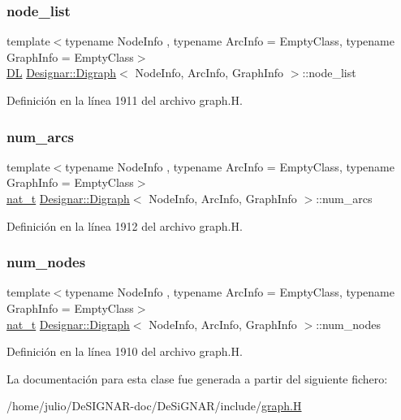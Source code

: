 \subsubsection{\texorpdfstring{node\+\_\+list}{node\_list}}
{\footnotesize\ttfamily template$<$typename Node\+Info , typename Arc\+Info  = Empty\+Class, typename Graph\+Info  = Empty\+Class$>$ \\
\hyperlink{class_designar_1_1_d_l}{DL} \hyperlink{class_designar_1_1_digraph}{Designar\+::\+Digraph}$<$ Node\+Info, Arc\+Info, Graph\+Info $>$\+::node\+\_\+list\hspace{0.3cm}{\ttfamily [protected]}}



Definición en la línea 1911 del archivo graph.\+H.

\mbox{\label{class_designar_1_1_digraph_accd2da6bdb5bc0624e7f79c904c89328}} 
\subsubsection{\texorpdfstring{num\+\_\+arcs}{num\_arcs}}
{\footnotesize\ttfamily template$<$typename Node\+Info , typename Arc\+Info  = Empty\+Class, typename Graph\+Info  = Empty\+Class$>$ \\
\hyperlink{namespace_designar_aa72662848b9f4815e7bf31a7cf3e33d1}{nat\+\_\+t} \hyperlink{class_designar_1_1_digraph}{Designar\+::\+Digraph}$<$ Node\+Info, Arc\+Info, Graph\+Info $>$\+::num\+\_\+arcs\hspace{0.3cm}{\ttfamily [protected]}}



Definición en la línea 1912 del archivo graph.\+H.

\mbox{\label{class_designar_1_1_digraph_a468cec4048ff9042a288dca47ad856aa}} 
\subsubsection{\texorpdfstring{num\+\_\+nodes}{num\_nodes}}
{\footnotesize\ttfamily template$<$typename Node\+Info , typename Arc\+Info  = Empty\+Class, typename Graph\+Info  = Empty\+Class$>$ \\
\hyperlink{namespace_designar_aa72662848b9f4815e7bf31a7cf3e33d1}{nat\+\_\+t} \hyperlink{class_designar_1_1_digraph}{Designar\+::\+Digraph}$<$ Node\+Info, Arc\+Info, Graph\+Info $>$\+::num\+\_\+nodes\hspace{0.3cm}{\ttfamily [protected]}}



Definición en la línea 1910 del archivo graph.\+H.



La documentación para esta clase fue generada a partir del siguiente fichero\+:\begin{DoxyCompactItemize}
\item 
/home/julio/\+De\+S\+I\+G\+N\+A\+R-\/doc/\+De\+Si\+G\+N\+A\+R/include/\hyperlink{graph_8_h}{graph.\+H}\end{DoxyCompactItemize}
